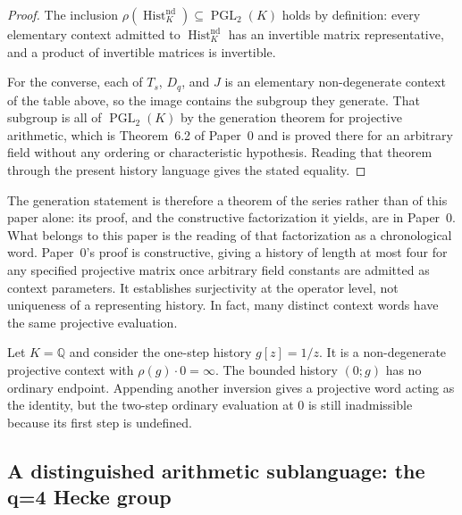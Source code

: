 \begin{proof}
The inclusion $\rho(\operatorname{Hist}^{\mathrm{nd}}_K)\subseteq
\operatorname{PGL}_2(K)$ holds by definition: every elementary context admitted
to $\operatorname{Hist}^{\mathrm{nd}}_K$ has an invertible matrix
representative, and a product of invertible matrices is invertible.

For the converse, each of $T_s$, $D_q$, and $J$ is an elementary non-degenerate
context of the table above, so the image contains the subgroup they generate.
That subgroup is all of $\operatorname{PGL}_2(K)$ by the generation theorem for
projective arithmetic, which is Theorem~6.2 of Paper~0 and is proved there for
an arbitrary field without any ordering or characteristic hypothesis.  Reading
that theorem through the present history language gives the stated equality.
\end{proof}

The generation statement is therefore a theorem of the series rather than of
this paper alone: its proof, and the constructive factorization it yields, are
in Paper~0.  What belongs to this paper is the reading of that factorization as
a chronological word.  Paper~0's proof is constructive, giving a history of
length at most four for any specified projective matrix once arbitrary field
constants are admitted as context parameters.  It establishes surjectivity at
the operator level, not uniqueness of a representing history.  In fact, many
distinct context words have the same projective evaluation.

\begin{example}
Let $K=\mathbb Q$ and consider the one-step history $g[z]=1/z$.  It is a
non-degenerate projective context with $\rho(g)\cdot0=\infty$.  The bounded
history $(0;g)$ has no ordinary endpoint.  Appending another inversion gives a
projective word acting as the identity, but the two-step ordinary evaluation
at $0$ is still inadmissible because its first step is undefined.
\end{example}

\subsection{A distinguished arithmetic sublanguage: the q=4 Hecke group}
\label{subsec:hecke-four-interface}

